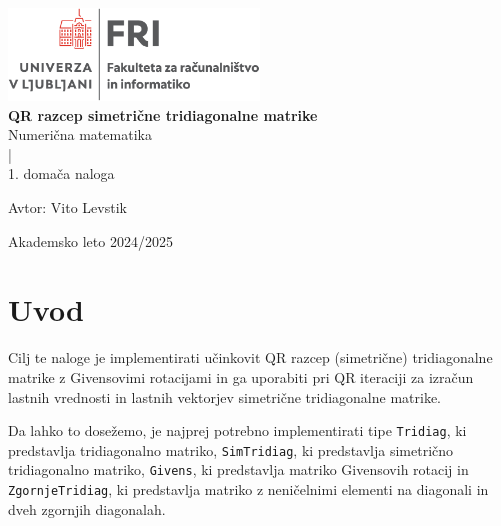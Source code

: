\documentclass[11pt, titlepage]{article}
\begin{document}
\begin{titlepage}
    \begin{center}
        \includegraphics[width=0.5\textwidth]{figures/FRI_logo.png}\\
        \vspace{0.5cm}
        \vspace{3cm}
        {\LARGE \bf QR razcep simetrične tridiagonalne matrike} \\
        \vspace{0.3cm}
        \vspace{2.0cm}
        {\large Numerična matematika}\\
        \vspace{0.2cm}
        {|}\\
        \vspace{0.2cm}
        {\large 1. domača naloga}\\
        \vspace{2.0cm}
    \end{center}
    \vfill
    \begin{flushleft}
        {\normalsize {\sf Avtor:} Vito Levstik\\}
    \end{flushleft}
    \vspace{2cm}
    \begin{center}
        {\normalsize \sc Akademsko leto 2024/2025}
    \end{center}
\end{titlepage}

\newpage

\section{Uvod}

Cilj te naloge je implementirati učinkovit QR razcep (simetrične) tridiagonalne matrike z Givensovimi rotacijami 
in ga uporabiti pri QR iteraciji za izračun lastnih vrednosti in lastnih vektorjev simetrične tridiagonalne matrike.

Da lahko to dosežemo, je najprej potrebno implementirati tipe \texttt{Tridiag}, ki predstavlja tridiagonalno matriko,
\texttt{SimTridiag}, ki predstavlja simetrično tridiagonalno matriko, \texttt{Givens}, ki predstavlja matriko Givensovih rotacij in
\texttt{ZgornjeTridiag}, ki predstavlja matriko z neničelnimi elementi na diagonali in dveh zgornjih diagonalah.
\end{document}
